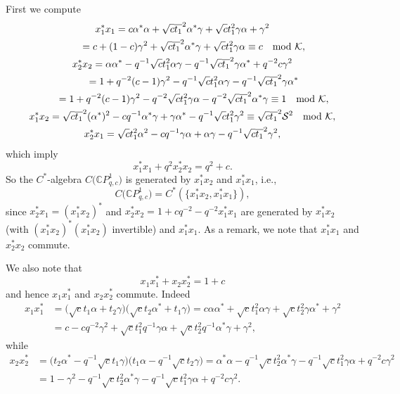 \documentclass[pdftex]{sigma}
\begin{document}
First we compute
\begin{gather*}
x_{1}^{\ast}x_{1} =c\alpha^{\ast}\alpha+\sqrt{c}\overline{t_{1}}^{2}%
\alpha^{\ast}\gamma+\sqrt{c}t_{1}^{2}\gamma\alpha+\gamma^{2}\\
\hphantom{x_{1}^{\ast}x_{1}}{} =c+(1-c) \gamma^{2}+\sqrt{c}\overline{t_{1}}^{2}\alpha^{\ast
}\gamma+\sqrt{c}t_{1}^{2}\gamma\alpha\equiv c\quad \text{mod\ }\mathcal{K},
\\
x_{2}^{\ast}x_{2} =\alpha\alpha^{\ast}-q^{-1}\sqrt{c}t_{1}^{2}\alpha
\gamma-q^{-1}\sqrt{c}\overline{t_{1}}^{2}\gamma\alpha^{\ast}+q^{-2}c\gamma
^{2}\\
\hphantom{x_{2}^{\ast}x_{2}}{} =1+q^{-2}(c-1) \gamma^{2}-q^{-1}\sqrt{c}t_{1}^{2}\alpha
\gamma-q^{-1}\sqrt{c}\overline{t_{1}}^{2}\gamma\alpha^{\ast}\\
\hphantom{x_{2}^{\ast}x_{2}}{} =1+q^{-2}(c-1) \gamma^{2}-q^{-2}\sqrt{c}t_{1}^{2}\gamma
\alpha-q^{-2}\sqrt{c}\overline{t_{1}}^{2}\alpha^{\ast}\gamma\equiv
1\quad \text{mod\ }\mathcal{K},
\\
x_{1}^{\ast}x_{2}=\sqrt{c}\overline{t_{1}}^{2} ( \alpha^{\ast} )
^{2}-cq^{-1}\alpha^{\ast}\gamma+\gamma\alpha^{\ast}-q^{-1}\sqrt{c}t_{1}%
^{2}\gamma^{2}\equiv\sqrt{c}\overline{t_{1}}^{2}\mathcal{S}^{2} \quad \text{mod\ }
\mathcal{K},
\\
x_{2}^{\ast}x_{1}=\sqrt{c}t_{1}^{2}\alpha^{2}-cq^{-1}\gamma\alpha+\alpha
\gamma-q^{-1}\sqrt{c}\overline{t_{1}}^{2}\gamma^{2},
\end{gather*}
which imply
\[
x_{1}^{\ast}x_{1}+q^{2}x_{2}^{\ast}x_{2}=q^{2}+c.
\]
So the $C^*$-algebra $C\big( \mathbb{C}P_{q,c}^{1}\big) $ is generated by
$x_{1}^{\ast}x_{2}$ and $x_{1}^{\ast}x_{1}$, i.e.,
\[
C \big( \mathbb{C}P_{q,c}^{1} \big) =C^{\ast} ( \{ x_{1}^{\ast
}x_{2}, x_{1}^{\ast}x_{1} \} ) ,
\]
since $x_{2}^{\ast}x_{1}= ( x_{1}^{\ast}x_{2} ) ^{\ast}$ and
$x_{2}^{\ast}x_{2}=1+cq^{-2}-q^{-2}x_{1}^{\ast}x_{1}$ are generated by
$x_{1}^{\ast}x_{2}$ (with $ ( x_{1}^{\ast}x_{2} ) ^{\ast} (
x_{1}^{\ast}x_{2} ) $ invertible) and $x_{1}^{\ast}x_{1}$. As a remark,
we note that $x_{1}^{\ast}x_{1}$ and $x_{2}^{\ast}x_{2}$ commute.

We also note that
\[
x_{1}x_{1}^{\ast}+x_{2}x_{2}^{\ast}=1+c
\]
and hence $x_{1}x_{1}^{\ast}$ and $x_{2}x_{2}^{\ast}$ commute. Indeed
\begin{align*}
x_{1}x_{1}^{\ast} & =\big( \sqrt{c}t_{1}\alpha+t_{2}\gamma\big) \big(
\sqrt{c}t_{2}\alpha^{\ast}+t_{1}\gamma\big) =c\alpha\alpha^{\ast}+\sqrt
{c}t_{1}^{2}\alpha\gamma+\sqrt{c}t_{2}^{2}\gamma\alpha^{\ast}+\gamma^{2}\\
& =c-cq^{-2}\gamma^{2}+\sqrt{c}t_{1}^{2}q^{-1}\gamma\alpha+\sqrt{c}t_{2}
^{2}q^{-1}\alpha^{\ast}\gamma+\gamma^{2},
\end{align*}
while
\begin{align*}
x_{2}x_{2}^{\ast} & =\big( t_{2}\alpha^{\ast}-q^{-1}\sqrt{c}t_{1}
\gamma\big) \big( t_{1}\alpha-q^{-1}\sqrt{c}t_{2}\gamma\big)
=\alpha^{\ast}\alpha-q^{-1}\sqrt{c}t_{2}^{2}\alpha^{\ast}\gamma-q^{-1}\sqrt
{c}t_{1}^{2}\gamma\alpha+q^{-2}c\gamma^{2}\\
& =1-\gamma^{2}-q^{-1}\sqrt{c}t_{2}^{2}\alpha^{\ast}\gamma-q^{-1}\sqrt
{c}t_{1}^{2}\gamma\alpha+q^{-2}c\gamma^{2}.
\end{align*}
\end{document}
